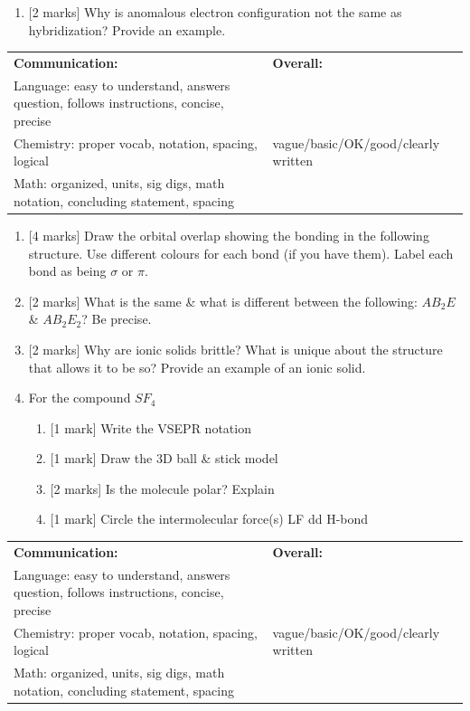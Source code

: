 \documentclass[11pt]{article}
\newcommand{\headerbox}{
    \noindent\begin{tabular}{|p{11cm}|p{5.5cm}|}
    \hline
    \scriptsize \textbf{Communication:} & \scriptsize \textbf{Overall:}\\
    \scriptsize Language: easy to understand, answers question, follows instructions, concise, precise & \\
    \scriptsize Chemistry: proper vocab, notation, spacing, logical & \scriptsize \space\space \space\space vague/basic/OK/good/clearly written \\
    \scriptsize Math: organized, units, sig digs, math notation, concluding statement, spacing & \\
    \hline
    \end{tabular}
    \vspace{1em}
}
\begin{document}
\begin{enumerate}[leftmargin=*, label=\arabic*., start=5]
    \item {[2 marks]} Why is anomalous electron configuration not the same as hybridization? Provide an example.
    \vspace{8em}
\end{enumerate}

\pagebreak

\headerbox

\begin{enumerate}[leftmargin=*, label=\arabic*., start=8]
    \item {[4 marks]} Draw the orbital overlap showing the bonding in the following structure. Use different colours for each bond (if you have them). Label each bond as being $\sigma$ or $\pi$.
    \vspace{2em}
    
    \indent {}
    \vspace{12em}

    \item {[2 marks]} What is the same \& what is different between the following: $AB_2E$ \& $AB_2E_2$? Be precise.
    \vspace{10em}

    \item {[2 marks]} Why are ionic solids brittle? What is unique about the structure that allows it to be so? Provide an example of an ionic solid.
    \vspace{10em}

    \item For the compound $SF_4$
    \begin{enumerate}[label=\textbf{\alph*.}]
        \item {[1 mark]} Write the VSEPR notation \hfill \underline{\hspace{5cm}}
        \item {[1 mark]} Draw the 3D ball \& stick model
        \vspace{10em}
        \item {[2 marks]} Is the molecule polar? Explain
        \vspace{6em}
        \item {[1 mark]} Circle the intermolecular force(s) \hfill LF \space \space \space \space dd \space \space \space \space H-bond
    \end{enumerate}
\end{enumerate}

\pagebreak

\headerbox
\end{document}
